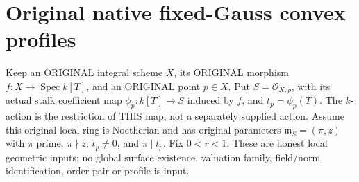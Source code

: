 \section{Original native fixed-Gauss convex profiles}

Keep an ORIGINAL integral scheme $X$, its ORIGINAL morphism
$f:X\to\operatorname{Spec}k[T]$, and an ORIGINAL point $p\in X$.
Put $S=\mathcal O_{X,p}$, with its actual stalk coefficient map
$\phi_p:k[T]\to S$ induced by $f$, and $t_p=\phi_p(T)$.
The $k$-action is the restriction of THIS map, not a separately supplied
action. Assume this original local ring is Noetherian and has original
parameters $\mathfrak m_S=(\pi,z)$ with $\pi$ prime, $\pi\nmid z$,
$t_p\ne0$, and $\pi\mid t_p$. Fix $0<r<1$.
These are honest local geometric inputs; no global surface existence,
valuation family, field/norm identification, order pair or profile is input.

